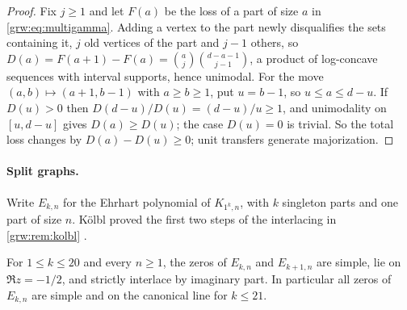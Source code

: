 
\begin{proof}
Fix $j\ge1$ and let $F(a)$ be the loss of a part of size $a$ in
\eqref{grw:eq:multigamma}. Adding a vertex to the part newly disqualifies
the sets containing it, $j$ old vertices of the part and $j-1$ others, so
$D(a)=F(a+1)-F(a)=\binom aj\binom{d-a-1}{j-1}$, a product of log-concave
sequences with interval supports, hence unimodal. For the move
$(a,b)\mapsto(a+1,b-1)$ with $a\ge b\ge1$, put $u=b-1$, so $u\le a\le d-u$.
If $D(u)>0$ then $D(d-u)/D(u)=(d-u)/u\ge1$, and unimodality on $[u,d-u]$
gives $D(a)\ge D(u)$; the case $D(u)=0$ is trivial. So the total loss
changes by $D(a)-D(u)\ge0$; unit transfers generate majorization.
\end{proof}

\paragraph{Split graphs.}
Write $E_{k,n}$ for the Ehrhart polynomial of $K_{1^k,n}$, with $k$
singleton parts and one part of size $n$. K\"olbl proved the first two
steps of the interlacing in \cref{grw:rem:kolbl}
\cite[Theorem~3.3]{Kolbl2024Ehrhart}.

\begin{theorem}\label{grw:thm:split}
For $1\le k\le20$ and every $n\ge1$, the zeros of $E_{k,n}$ and $E_{k+1,n}$
are simple, lie on $\Re z=-1/2$, and strictly interlace by imaginary part.
In particular all zeros of $E_{k,n}$ are simple and on the canonical line
for $k\le21$.
\end{theorem}

